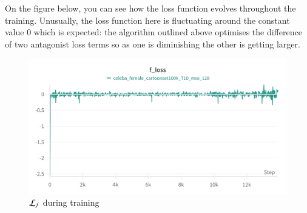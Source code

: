 \documentclass[11pt]{article}
\begin{document}
On the figure below, you can see how the loss function evolves throughout the training. Unusually, the loss function here is fluctuating around the constant value 0 which is expected: the algorithm outlined above optimises the difference of two antagonist loss terms so as one is diminishing the other is getting larger.

\begin{figure}[h!]
    \centering
    \includegraphics[scale=.05]{figures/loss_real_dataset.png}
    \caption{${\cal L}_f$ during training}
    \bigskip
\end{figure}
\end{document}
